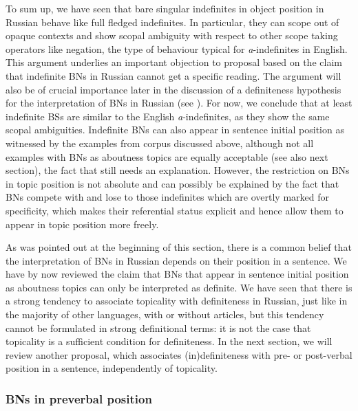 \documentclass[output=paper,colorlinks,citecolor=brown]{langscibook}
\begin{document}
To sum up, we have seen that bare singular indefinites in object position in Russian behave like full fledged indefinites. In particular, they can scope out of opaque contexts and show scopal ambiguity with respect to other scope taking operators like negation, the type of behaviour typical for \textit{a}-indefinites in English. This argument underlies an important objection to  proposal based on the claim that indefinite BNs in Russian cannot get a specific reading. The argument will also be of crucial importance later in the discussion of a definiteness hypothesis for the interpretation of BNs in Russian (see ). For now, we conclude that at least indefinite BSs are similar to the English \textit{a}-indefinites, as they show the same scopal ambiguities. Indefinite BNs can also appear in sentence initial position as witnessed by the examples from corpus discussed above, although not all examples with BNs as aboutness topics are equally acceptable (see also next section), the fact that still needs an explanation. However, the restriction on BNs in topic position is not absolute and can possibly be explained by the fact that BNs compete with and lose to those indefinites which are overtly marked for specificity,  which makes their referential status explicit and hence allow them to appear in topic position more freely. 

As was pointed out at the beginning of this section, there is a common belief that the interpretation of BNs in Russian depends on their position in a sentence. We have by now reviewed the claim that BNs that appear in sentence initial position as aboutness topics can only be interpreted as definite. We have seen that there is a strong tendency to associate topicality with definiteness in Russian, just like in the majority of other languages, with or without articles, but this tendency cannot be formulated in strong definitional terms: it is not the case that topicality is a sufficient condition for definiteness. In the next section, we will review another proposal, which associates (in)definiteness with pre- or post-verbal position in a sentence, independently of topicality. 


\subsubsection{BNs in preverbal position} \label{BNpreverbal}
\end{document}
